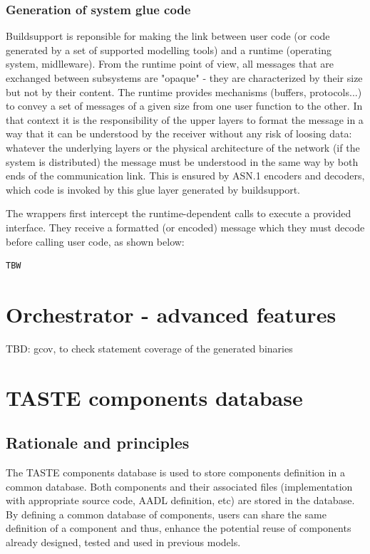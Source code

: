 \documentclass[11pt]{book}
\begin{document}
\subsection{Generation of system glue code}

Buildsupport is reponsible for making the link between user code (or code generated by a set of supported modelling tools) and a runtime (operating system, midlleware). From the runtime point of view, all messages that are exchanged between subsystems are "opaque" - they are characterized by their size but not by their content. The runtime provides mechanisms (buffers, protocols...) to convey a set of messages of a given size from one user function to the other. In that context it is the responsibility of the upper layers to format the message in a way that it can be understood by the receiver without any risk of loosing data: whatever the underlying layers or the physical architecture of the network (if the system is distributed) the message must be understood in the same way by both ends of the communication link. This is ensured by ASN.1 encoders and decoders, which code is invoked by this glue layer generated by buildsupport.

The wrappers first intercept the runtime-dependent calls to execute a provided interface. They receive a formatted (or encoded) message which they must decode before calling user code, as shown below:
\begin{lstlisting}
TBW
\end{lstlisting}


\chapter{Orchestrator - advanced features}
TBD: gcov, to check statement coverage of the generated binaries

\chapter{TASTE components database}
\label{chapter-components-database}
   \section{Rationale and principles}
   The TASTE components database is used to store components definition in a
   common database. Both components and their associated files (implementation
   with appropriate source code, AADL definition, etc) are stored in the
   database. By defining a common database of components, users can share the
   same definition of a component and thus, enhance the potential reuse of
   components already designed, tested and used in previous models.
\end{document}
